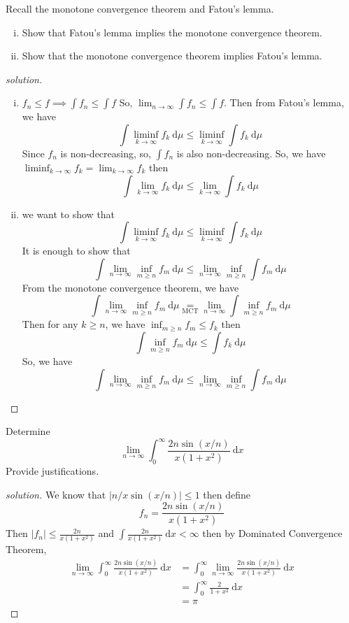 \begin{problem}
  Recall the monotone convergence theorem and Fatou's lemma.
  \begin{enumerate}[(i)]
    \item Show that Fatou's lemma implies the monotone convergence theorem.
    \item Show that the monotone convergence theorem implies Fatou's lemma.
  \end{enumerate}
\end{problem}

\begin{proof}[solution]
  \begin{enumerate}[(i)]
    \item $f_n \le f \implies \int f_n \le \int f$ So, $\lim_{n\to\infty} \int f_n \le \int f$.
    Then from Fatou's lemma, we have
      \[\int \liminf_{k\to\infty} f_k \ \mathrm{d}\mu \le \liminf_{k\to\infty}\int f_k \ \mathrm{d}\mu\]
    Since $f_n$ is non-decreasing, so, $\int f_n$ is also non-decreasing. So, we have $\displaystyle\liminf_{k\to\infty} f_k = \lim_{k\to\infty} f_k$ then
    \[\int \lim_{k\to\infty} f_k \ \mathrm{d}\mu \le \lim_{k\to\infty}\int f_k \ \mathrm{d}\mu\]
    \item we want to show that 
    \[\int \liminf_{k\to\infty} f_k \ \mathrm{d}\mu \le \liminf_{k\to\infty}\int f_k \ \mathrm{d}\mu\]
    It is enough to show that
    \[\int \lim_{n\to\infty} \inf_{m \ge n} f_m \ \mathrm{d}\mu \le \lim_{n\to\infty} \inf_{m \ge n}\int f_m \ \mathrm{d}\mu\]
    From the monotone convergence theorem, we have
    \[\int \lim_{n\to\infty} \inf_{m \ge n} f_m \ \mathrm{d}\mu \underset{\text{MCT}}= \lim_{n\to\infty}\int \inf_{m \ge n} f_m \ \mathrm{d}\mu\]
    Then for any $k \ge n$, we have $\inf_{m \ge n} f_m \le f_k$ then
    \[\int \inf_{m \ge n} f_m \ \mathrm{d}\mu\le \int f_k \ \mathrm{d}\mu\]
    So, we have 
    \[\int \lim_{n\to\infty} \inf_{m \ge n} f_m \ \mathrm{d}\mu \le \lim_{n\to\infty} \inf_{m \ge n}\int f_m \ \mathrm{d}\mu\]
  \end{enumerate} 
\end{proof}

\begin{problem}
  Determine
  \[\lim_{n\to\infty} \int_0^\infty\frac{2n \sin(x/n)}{x(1+x^2)}\ \mathrm{d}x\]
  Provide justifications.
\end{problem}

\begin{proof}[solution]
  We know that $|n/x \sin(x/n)| \le 1$ then define 
  \[f_n = \frac{2n \sin(x/n)}{x(1+x^2)}\]
  Then $|f_n| \le \frac{2n}{x(1+x^2)}$ and $\int \frac{2n}{x(1+x^2)} \ \mathrm{d}x < \infty$ then by Dominated Convergence Theorem,
  \begin{align*}
  \lim_{n\to\infty} \int_0^\infty\frac{2n \sin(x/n)}{x(1+x^2)}\ \mathrm{d}x &= \int_0^\infty \lim_{n\to\infty} \frac{2n \sin(x/n)}{x(1+x^2)}\ \mathrm{d}x \\
  &= \int_0^\infty \frac{2}{1+x^2}\ \mathrm{d}x\\
  &= \pi
  \end{align*}

\end{proof}

